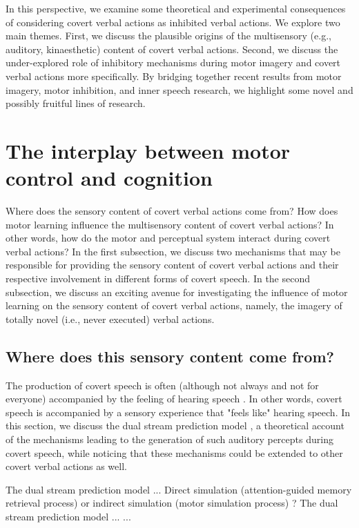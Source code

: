 \documentclass[utf8]{template/frontiersSCNS} %
\begin{document}
In this perspective, we examine some theoretical and experimental consequences of considering covert verbal actions as inhibited verbal actions. We explore two main themes. First, we discuss the plausible origins of the multisensory (e.g., auditory, kinaesthetic) content of covert verbal actions. Second, we discuss the under-explored role of inhibitory mechanisms during motor imagery and covert verbal actions more specifically. By bridging together recent results from motor imagery, motor inhibition, and inner speech research, we highlight some novel and possibly fruitful lines of research.

\section{The interplay between motor control and cognition}

Where does the sensory content of covert verbal actions come from? How does motor learning influence the multisensory content of covert verbal actions? In other words, how do the motor and perceptual system interact during covert verbal actions? In the first subsection, we discuss two mechanisms that may be responsible for providing the sensory content of covert verbal actions and their respective involvement in different forms of covert speech. In the second subsection, we discuss an exciting avenue for investigating the influence of motor learning on the sensory content of covert verbal actions, namely, the imagery of totally novel (i.e., never executed) verbal actions.

\subsection{Where does this sensory content come from?}

The production of covert speech is often (although not always and not for everyone) accompanied by the feeling of hearing speech \cite{hurlburt_investigating_2011}. In other words, covert speech is accompanied by a sensory experience that "feels like" hearing speech. In this section, we discuss the dual stream prediction model \citep{tian_mental_2012, tian_effect_2013, tian_mental_2016}, a theoretical account of the mechanisms leading to the generation of such auditory percepts during covert speech, while noticing that these mechanisms could be extended to other covert verbal actions as well.

The dual stream prediction model \citep{tian_mental_2012, tian_effect_2013, tian_mental_2016}... Direct simulation (attention-guided memory retrieval process) or indirect simulation (motor simulation process) \citep{tian_mental_2012, tian_effect_2013, li_corollary_2020, ma_distinct_2019}? The dual stream prediction model \citep{tian_mental_2016}... \citep[similar to the distinction between the prediction-by-simulation or prediction-by-association mechanisms of][]{pickering_integrated_2013}...
\end{document}
